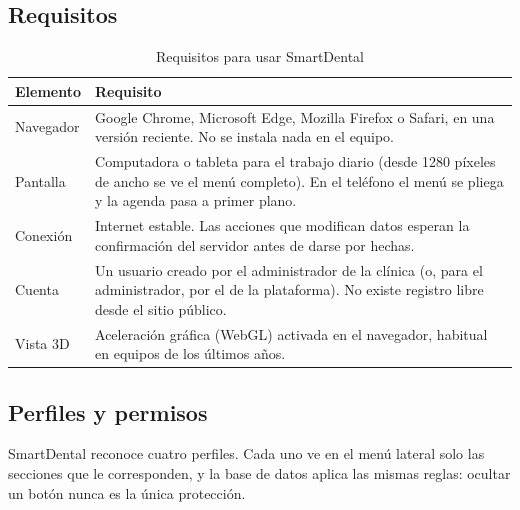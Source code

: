 \documentclass[11pt]{article}
\begin{document}
\subsection{Requisitos}

\begin{table}[H]
\centering\small
\caption{Requisitos para usar SmartDental}\label{tab:requisitos}
\begin{tabularx}{\linewidth}{@{}P{3.6cm}L@{}}
\toprule
\textbf{Elemento} & \textbf{Requisito} \\
\midrule
Navegador & Google Chrome, Microsoft Edge, Mozilla Firefox o Safari, en una versión reciente. No se instala nada en el equipo. \\
Pantalla & Computadora o tableta para el trabajo diario (desde 1280 píxeles de ancho se ve el menú completo). En el teléfono el menú se pliega y la agenda pasa a primer plano. \\
Conexión & Internet estable. Las acciones que modifican datos esperan la confirmación del servidor antes de darse por hechas. \\
Cuenta & Un usuario creado por el administrador de la clínica (o, para el administrador, por el de la plataforma). No existe registro libre desde el sitio público. \\
Vista 3D & Aceleración gráfica (WebGL) activada en el navegador, habitual en equipos de los últimos años. \\
\bottomrule
\end{tabularx}
\end{table}

\subsection{Perfiles y permisos}\label{sec:roles}

SmartDental reconoce cuatro perfiles. Cada uno ve en el menú lateral solo las secciones que le corresponden, y la base de datos aplica las mismas reglas: ocultar un botón nunca es la única protección.
\end{document}

